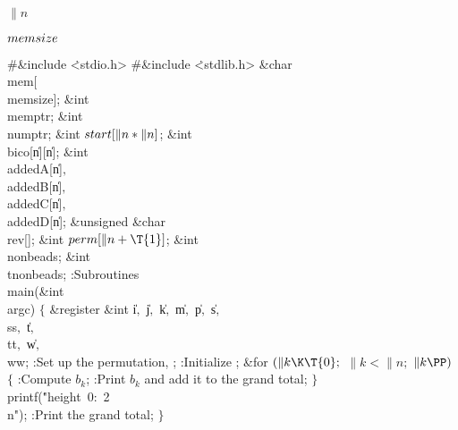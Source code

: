 \Y\B\4\D$\|n$ \5
\par
\B\4\D$\\{memsize}$ \5
\par
\Y\B\8\#\&{include} \.{<stdio.h>}\6
\8\#\&{include} \.{<stdlib.h>}\6
\&{char} \\{mem}[\\{memsize}];\6
\&{int} \\{memptr};\6
\&{int} \\{numptr};\6
\&{int} ${}\\{start}[\|n*\|n]{}$;\6
\&{int} \\{bico}[\|n][\|n];\6
\&{int} \\{addedA}[\|n]${},{}$ \\{addedB}[\|n]${},{}$ \\{addedC}[\|n]${},{}$ %
\\{addedD}[\|n];\6
\&{unsigned} \&{char} \\{rev}[];\6
\&{int} ${}\\{perm}[\|n+\T{1}]{}$;\6
\&{int} \\{nonbeads};\6
\&{int} \\{tnonbeads};\7
:Subroutines\X\7
\\{main}(\&{int} \\{argc})\1\1\2\2\6
${}\{{}$\1\6
\&{register} \&{int} \|i${},{}$ \|j${},{}$ \|k${},{}$ \|m${},{}$ \|p${},{}$ %
\|s${},{}$ \\{ss}${},{}$ \|t${},{}$ \\{tt}${},{}$ \|w${},{}$ \\{ww};\7
:Set up the permutation, \X;\6
:Initialize \X;\6
\&{for} ${}(\|k\K\T{0};{}$ ${}\|k<\|n;{}$ ${}\|k\PP){}$\5
${}\{{}$\1\6
:Compute $b_k$\X;\6
:Print $b_k$ and add it to the grand total\X;\6
\4${}\}{}$\2\6
\\{printf}(\.{"height\ 0:\ 2\\n"});\6
:Print the grand total\X;\6
\4${}\}{}$\2\par
\fi

